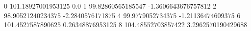 0 101.18927001953125 0.0
1 99.82860565185547 -1.3606643676757812
2 98.90521240234375 -2.2840576171875
4 99.9779052734375 -1.21136474609375
6 101.4527587890625 0.26348876953125
8 104.48552703857422 3.2962570190429688
